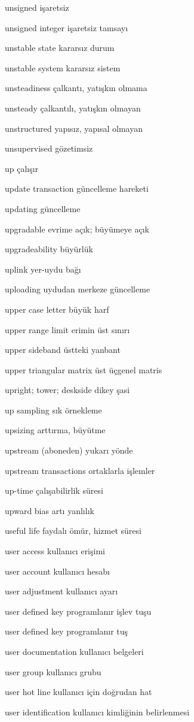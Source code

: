\documentclass[12pt,fleqn]{article}\usepackage{../../common}
\begin{document}
unsigned işaretsiz

unsigned integer işaretsiz tamsayı

unstable state kararsız durum

unstable system kararsız sistem

unsteadiness çalkantı, yatışkın olmama

unsteady çalkantılı, yatışkın olmayan

unstructured yapısız, yapısal olmayan

unsupervised gözetimsiz

up çalışır

update transaction güncelleme hareketi

updating güncelleme

upgradable evrime açık; büyümeye açık

upgradeability büyürlük

uplink yer-uydu bağı

uploading uydudan merkeze güncelleme

upper case letter büyük harf

upper range limit erimin üst sınırı

upper sideband üstteki yanbant

upper triangular matrix üst üçgenel matris

upright; tower; deskside dikey şasi

up sampling sık örnekleme

upsizing arttırma, büyütme

upstream (aboneden) yukarı yönde

upstream transactions ortaklarla işlemler

up-time çalışabilirlik süresi

upward bias artı yanlılık

useful life faydalı ömür, hizmet süresi

user access kullanıcı erişimi

user account kullanıcı hesabı

user adjustment kullanıcı ayarı

user defined key programlanır işlev tuşu

user defined key programlanır tuş

user documentation kullanıcı belgeleri

user group kullanıcı grubu

user hot line kullanıcı için doğrudan hat

user identification kullanıcı kimliğinin belirlenmesi
\end{document}
